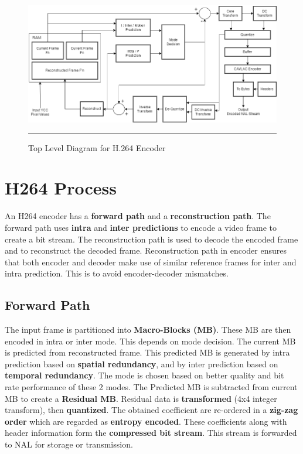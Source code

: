 \begin{figure}[htbp]
	\centering
	\includegraphics[width = 5in]{./Figures/toplevel.png}
	\rule{35em}{0.5pt}
	\caption{Top Level Diagram for H.264 Encoder}
	\label{fig:toplevel}
\end{figure}

\section{H264 Process}
An H264 encoder has a \textbf{forward path} and a \textbf{reconstruction path}. The forward path uses \textbf{intra} and \textbf{inter predictions} to encode a video frame to create a bit stream. The reconstruction path is used to decode the encoded frame and to reconstruct the decoded frame. Reconstruction path in encoder ensures that both encoder and decoder make use of similar reference frames for inter and intra prediction. This is to avoid encoder-decoder mismatches. 

\subsection{Forward Path}
The input frame is partitioned into \textbf{Macro-Blocks (MB)}. These MB are then encoded in intra or inter mode. This depends on mode decision. The current MB is predicted from reconstructed frame. This predicted MB is generated by intra prediction based on \textbf{spatial redundancy}, and by inter prediction based on \textbf{temporal redundancy}. The mode is chosen based on better quality and bit rate performance of these 2 modes. The Predicted MB is subtracted from current MB to create a \textbf{Residual MB}. Residual data is \textbf{transformed} (4x4 integer transform), then \textbf{quantized}. The obtained coefficient are re-ordered in a \textbf{zig-zag order} which are regarded as \textbf{entropy encoded}. These coefficients along with header information form the \textbf{compressed bit stream}. This stream is forwarded to NAL for storage or transmission. 

